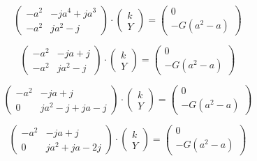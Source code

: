 \documentclass{article}
\begin{document}
$$
    \begin{pmatrix}
        -a^2 & - j a^4 + j a^3 \\
        -a^2 & j a^2 - j
    \end{pmatrix}
    \cdot
    \begin{pmatrix}
        k \\
        Y
    \end{pmatrix}
    =
    \begin{pmatrix}
        0 \\
        - G (a^2 - a)
    \end{pmatrix}
$$

$$
    \begin{pmatrix}
        -a^2 & - j a + j \\
        -a^2 & j a^2 - j
    \end{pmatrix}
    \cdot
    \begin{pmatrix}
        k \\
        Y
    \end{pmatrix}
    =
    \begin{pmatrix}
        0 \\
        - G (a^2 - a)
    \end{pmatrix}
$$

$$
    \begin{pmatrix}
        -a^2 & - j a + j           \\
        0    & j a^2 - j + j a - j
    \end{pmatrix}
    \cdot
    \begin{pmatrix}
        k \\
        Y
    \end{pmatrix}
    =
    \begin{pmatrix}
        0 \\
        - G (a^2 - a)
    \end{pmatrix}
$$

$$
    \begin{pmatrix}
        -a^2 & - j a + j         \\
        0    & j a^2 + j a - 2 j
    \end{pmatrix}
    \cdot
    \begin{pmatrix}
        k \\
        Y
    \end{pmatrix}
    =
    \begin{pmatrix}
        0 \\
        - G (a^2 - a)
    \end{pmatrix}
$$
\end{document}
